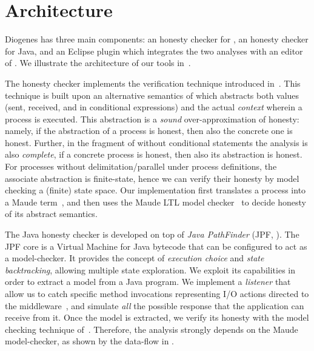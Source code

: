 \section{Architecture}

Diogenes has three main components:
an honesty checker for \coco,
an honesty checker for Java,
and an Eclipse plugin which integrates the two analyses
with an editor of \coco.
We illustrate the architecture of our tools in~.

The \coco honesty checker implements the  
verification technique introduced in~\cite{BCPZ15jlamp}.
This technique is built upon an alternative semantics of \coco 
which abstracts both values (sent, received, and in conditional expressions) 
and the actual \emph{context} wherein a process is executed.
This abstraction is a \emph{sound} over-approximation of honesty:
namely, if the abstraction of a process is honest,
then also the concrete one is honest.
Further, in the fragment of \coco without conditional statements
the analysis is also \emph{complete},
\ie if a concrete process is honest, then also its abstraction is honest.
For processes without delimitation/parallel under process definitions,
the associate abstraction is finite-state, 
hence we can verify their honesty by model checking a (finite) state space.
Our implementation 
first translates a \coco process into a Maude term~\cite{Maude01}, 
and then uses the Maude LTL model checker~\cite{Eker02maude}
to decide honesty of its abstract semantics.

The Java honesty checker is developed on top of \emph{Java PathFinder}
(JPF, \cite{lerda2001addressing,visser2003model}).
The JPF core is a Virtual Machine for Java bytecode
that can be configured to act as a model-checker.
It provides the concept of \emph{execution choice}
and \emph{state backtracking}, allowing multiple state exploration.
%
We exploit its capabilities in order to extract a \coco model
from a Java program. We implement a \emph{listener} that allow us
to catch specific method invocations representing I/O actions
directed to the middleware~\cite{CO2middleware},
and simulate \emph{all} the possible response that 
the application can receive from it.
Once the \coco model is extracted, we verify its honesty
with the model checking technique of~\cite{BCPZ15jlamp}.
Therefore, the analysis strongly depends on the Maude model-checker,
as shown by the data-flow in .

